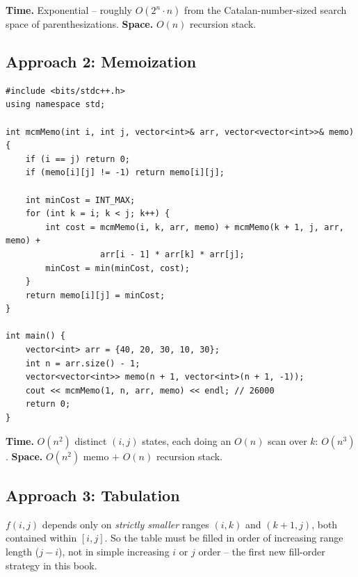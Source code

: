 \begin{complexitybox}
\textbf{Time.} Exponential -- roughly $O(2^n \cdot n)$ from the
Catalan-number-sized search space of parenthesizations.
\textbf{Space.} $O(n)$ recursion stack.
\end{complexitybox}

\subsection*{Approach 2: Memoization}

\begin{lstlisting}
#include <bits/stdc++.h>
using namespace std;

int mcmMemo(int i, int j, vector<int>& arr, vector<vector<int>>& memo) {
    if (i == j) return 0;
    if (memo[i][j] != -1) return memo[i][j];

    int minCost = INT_MAX;
    for (int k = i; k < j; k++) {
        int cost = mcmMemo(i, k, arr, memo) + mcmMemo(k + 1, j, arr, memo) +
                   arr[i - 1] * arr[k] * arr[j];
        minCost = min(minCost, cost);
    }
    return memo[i][j] = minCost;
}

int main() {
    vector<int> arr = {40, 20, 30, 10, 30};
    int n = arr.size() - 1;
    vector<vector<int>> memo(n + 1, vector<int>(n + 1, -1));
    cout << mcmMemo(1, n, arr, memo) << endl; // 26000
    return 0;
}
\end{lstlisting}

\begin{complexitybox}
\textbf{Time.} $O(n^2)$ distinct $(i,j)$ states, each doing an $O(n)$
scan over $k$: $O(n^3)$.
\textbf{Space.} $O(n^2)$ memo $+$ $O(n)$ recursion stack.
\end{complexitybox}

\subsection*{Approach 3: Tabulation}

\begin{ideabox}
$f(i,j)$ depends only on \emph{strictly smaller} ranges $(i,k)$ and
$(k{+}1,j)$, both contained within $[i,j]$. So the table must be filled
in order of increasing range length ($j-i$), not in simple increasing
$i$ or $j$ order -- the first new fill-order strategy in this book.
\end{ideabox}

